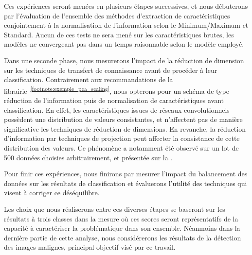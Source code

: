 Ces expériences seront menées en plusieurs étapes successives, et nous débuterons par l'évaluation de l'ensemble des méthodes d'extraction de caractéristiques conjointement à la normalisation de l'information selon le Minimum/Maximum et Standard. Aucun de ces tests ne sera mené sur les caractéristiques brutes, les modèles ne convergeant pas dans un temps raisonnable selon le modèle employé.\par

Dans une seconde phase, nous mesurerons l'impact de la réduction de dimension sur les techniques de transfert de connaissance avant de procéder à leur classification. Contrairement aux recommandations de la librairie~\textsuperscript{\ref{footnote:exemple_pca_scaling}}, nous opterons pour un schéma de type réduction de l'information puis de normalisation de caractéristiques avant classification. En effet, les caractéristiques issues de réseaux convolutionnels possèdent une distribution de valeurs consistantes, et n'affectent pas de manière significative les techniques de réduction de dimensions. En revanche, la réduction d'information par techniques de projection peut affecter la consistance de cette distribution des valeurs. Ce phénomène a notamment été observé sur un lot de 500 données choisies arbitrairement, et présentée sur la .\par

Pour finir ces expériences, nous finirons par mesurer l'impact du balancement des données sur les résultats de classification et évaluerons l'utilité des techniques qui visent à corriger ce déséquilibre.\par

Les choix que nous réaliserons entre ces diverses étapes se baseront sur les résultats à trois classes dans la mesure où ces scores seront représentatifs de la capacité à caractériser la problématique dans son ensemble. Néanmoins dans la dernière partie de cette analyse, nous considérerons les résultats de la détection des images malignes, principal objectif visé par ce travail.\par

\addtocounter{footnote}{1}
 
